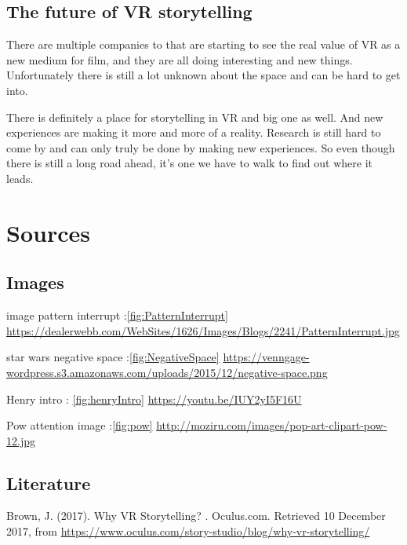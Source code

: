 \documentclass{report}
\begin{document}
				
				\section{The future of VR storytelling}
				
				There are multiple companies to that are starting to see the real value of VR as a new medium for film, and they are all doing interesting and new things. Unfortunately there is still a lot unknown about the space and can be hard to get into.
				 				
				There is definitely a place for storytelling in VR and big one as well. And new experiences are making it more and more of a reality. Research is still hard to come by and can only truly be done by making new experiences. So even though there is still a long road ahead, it's one we have to walk to find out where it leads.
				
				\chapter{Sources}
				
				\section{Images}
				
				
				image pattern interrupt :\ref{fig:PatternInterrupt} \href{https://dealerwebb.com/WebSites/1626/Images/Blogs/2241/PatternInterrupt.jpg}{https://dealerwebb.com/WebSites/1626/Images/Blogs/2241/PatternInterrupt.jpg}
				
				star wars negative space :\ref{fig:NegativeSpace} \href{https://venngage-wordpress.s3.amazonaws.com/uploads/2015/12/negative-space.png}{https://venngage-wordpress.s3.amazonaws.com/uploads/2015/12/negative-space.png}
				
				Henry intro : \ref{fig:henryIntro} \href{https://youtu.be/IUY2yI5F16U}{https://youtu.be/IUY2yI5F16U}
				
				Pow attention image :\ref{fig:pow}
				\href{http://moziru.com/images/pop-art-clipart-pow-12.jpg}{http://moziru.com/images/pop-art-clipart-pow-12.jpg}
				
				\section{Literature}
				
				Brown, J. (2017). Why VR Storytelling? . Oculus.com. Retrieved 10 December 2017, from \href{https://www.oculus.com/story-studio/blog/why-vr-storytelling/}{https://www.oculus.com/story-studio/blog/why-vr-storytelling/}
				
\end{document}
